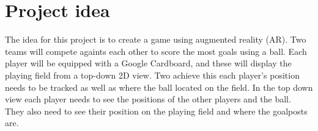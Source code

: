 \section{Project idea}
The idea for this project is to create a game using augmented reality (AR). 
Two teams will compete againts each other to score the most goals using a ball. 
Each player will be equipped with a Google Cardboard, and these will display the playing field from a top-down 2D view. 
Two achieve this each player's position needs to be tracked as well as where the ball located on the field.
In the top down view each player needs to see the positions of the other players and the ball. 
They also need to see their position on the playing field and where the goalposts are.
